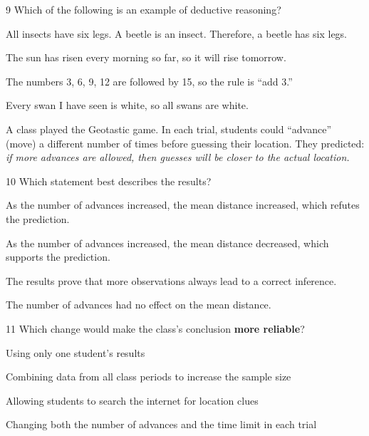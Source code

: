 \documentclass[11pt,letterpaper]{article}
\begin{document}
\begin{mcq}{9}
Which of the following is an example of deductive reasoning?
\begin{choices}
  \item All insects have six legs. A beetle is an insect. Therefore, a beetle has six legs.
  \item The sun has risen every morning so far, so it will rise tomorrow.
  \item The numbers 3, 6, 9, 12 are followed by 15, so the rule is ``add 3.''
  \item Every swan I have seen is white, so all swans are white.
\end{choices}
\end{mcq}


A class played the Geotastic game. In each trial, students could ``advance'' (move) a different number of times before guessing their location. They predicted: \emph{if more advances are allowed, then guesses will be closer to the actual location.}


\begin{mcq}{10}
Which statement best describes the results?
\begin{choices}
  \item As the number of advances increased, the mean distance increased, which refutes the prediction.
  \item As the number of advances increased, the mean distance decreased, which supports the prediction.
  \item The results prove that more observations always lead to a correct inference.
  \item The number of advances had no effect on the mean distance.
\end{choices}
\end{mcq}

\begin{mcq}{11}
Which change would make the class's conclusion \textbf{more reliable}?
\begin{choices}
  \item Using only one student's results
  \item Combining data from all class periods to increase the sample size
  \item Allowing students to search the internet for location clues
  \item Changing both the number of advances and the time limit in each trial
\end{choices}
\end{mcq}
\end{document}
